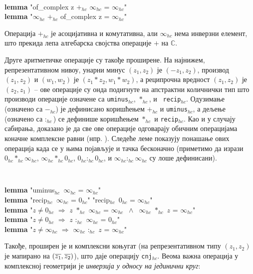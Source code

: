 {\tt
\begin{tabbing}
\textbf{lemma} "of\_complex z $+_{hc}$ $\infty_{hc}$ = $\infty_{hc}$"\\
\textbf{lemma} "$\infty_{hc}$ $+_{hc}$ of\_complex z = $\infty_{hc}$"
\end{tabbing}
}

Операција $+_{hc}$ је асоцијативна и комутативна, али $\infty_{hc}$
нема инверзни елемент, што прекида лепа алгебарска својства операције
$+$ на $\mathbb{C}$.

Друге аритметичке операције су такође проширене. На најнижем,
репрезентативном нивоу, унарни минус $(z_1, z_2)$ је $(-z_1, z_2)$,
производ $(z_1, z_2)$ и $(w_1, w_2)$ је $(z_1*z_2, w_1*w_2)$, а
реципрочна вредност $(z_1, z_2)$ је $(z_2, z_1)$ -- ове операције су
онда подигнуте на апстрактни количнички тип што производи операције
означене са {\tt uminus}$_{hc}$, $*_{hc}$, и {\tt
  recip}$_{hc}$. Одузимање (означено са $-_{hc}$) је дефинисано
коришћењем $+_{hc}$ и {\tt uminus}$_{hc}$, а дељење (означено са
$:_{hc}$) се дефинише коришћењем $*_{hc}$ и {\tt recip}$_{hc}$. Као и
у случају сабирања, доказано је да све ове операције одговарају
обичним операцијама коначне комплексне равни
(нпр. ). Следеће леме показују понашање
ових операција када се у њима појављује и тачка бесконачно (приметимо
да изрази $0_{hc} *_{hc} \infty_{hc}$, $\infty_{hc} *_{hc} 0_{hc}$,
$0_{hc} :_{hc} 0_{hc}$, и $\infty_{hc} :_{hc} \infty_{hc}$ су лоше
дефинисани).

{\tt
\begin{tabbing}
  \textbf{lemma} "uminus$_{hc}$\ $\infty_{hc}$ = $\infty_{hc}$"\\
  \textbf{lemma} "recip$_{hc}$\ $\infty_{hc}$ = $0_{hc}$" "recip$_{hc}$\ $0_{hc}$ = $\infty_{hc}$"\\
  \textbf{lemma} "$z \neq 0_{hc}$ $\Longrightarrow$ $z$ $*_{hc}$ $\infty_{hc}$ = $\infty_{hc}$ $\ \wedge\ $  $\infty_{hc}$ $*_{hc}$ $z$ = $\infty_{hc}$"\\
  \textbf{lemma} "$z \neq 0_{hc}$ $\Longrightarrow$ $z$ $:_{hc}$ $\infty_{hc}$ = $0_{hc}$"\\
  \textbf{lemma} "$z \neq \infty_{hc}$ $\Longrightarrow$ $\infty_{hc}$ $:_{hc}$ $z$ = $\infty_{hc}$"
\end{tabbing}
}

Такође, проширен је и комплексни коњугат (на репрезентативном типу
$(z_1, z_2)$ је мапирано на $(\overline{z_1}, \overline{z_2})$), што даје
операцију {\tt cnj}$_{hc}$. Веома важна операција у комплексној
геометрији је \emph{инверзија у односу на јединични круг}:

